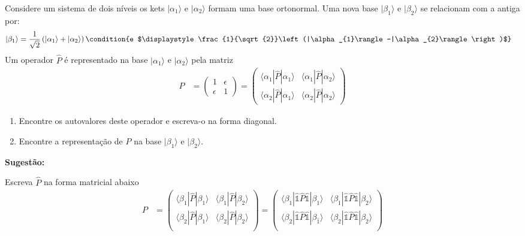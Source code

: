	\begin{prob}
		Considere um sistema de dois níveis os kets $|\alpha_{1}\rangle$ e $|\alpha_{2}\rangle$ formam uma base ortonormal. Uma nova base $|\beta_{1}\rangle$ e $|\beta_{2}\rangle$ se relacionam com a antiga por:
		\begin{align}
			|\beta_{1}\rangle &= \frac{1}{\sqrt{2}}\left(|\alpha_{1}\rangle+|\alpha_{2}\rangle\right)\condition{e $\displaystyle\frac{1}{\sqrt{2}}\left(|\alpha_{1}\rangle-|\alpha_{2}\rangle\right)$}
		\end{align}
		Um operador $\hat{P}$ é representado na base $|\alpha_{1}\rangle$ e $|\alpha_{2}\rangle$ pela matriz
		\begin{align}
			P &= 
			\begin{pmatrix}
				1 & \epsilon \\
				\epsilon & 1
			\end{pmatrix}
			=
			\begin{pmatrix}
			\langle \alpha_{1}|\hat{P}|\alpha_{1}\rangle & \langle \alpha_{1}|\hat{P}|\alpha_{2}\rangle \\
			\langle \alpha_{2}|\hat{P}|\alpha_{1}\rangle & \langle \alpha_{2}|\hat{P}|\alpha_{2}\rangle
			\end{pmatrix}
		\end{align}
		\begin{enumerate}[label=\alph *)]
			\item Encontre os autovalores deste operador e escreva-o na forma diagonal.
			\item Encontre a representação de $\hat{P}$ na base $|\beta_{1}\rangle$ e $|\beta_{2}\rangle$.
		\end{enumerate}

		\textbf{Sugestão:}

		Escreva $\hat{P}$ na forma matricial abaixo
		\begin{align}
			P &=
			\begin{pmatrix}
				\langle \beta_{1}|\hat{P}|\beta_{1}\rangle & \langle \beta_{1}|\hat{P}|\beta_{2}\rangle \\
				\langle \beta_{2}|\hat{P}|\beta_{1}\rangle & \langle \beta_{2}|\hat{P}|\beta_{2}\rangle \\
			\end{pmatrix}
			=
			\begin{pmatrix}
				\langle \beta_{1}|\mathbb{\hat{1}}\hat{P}\mathbb{\hat{1}}|\beta_{1}\rangle & \langle \beta_{1}|\mathbb{\hat{1}}\hat{P}\mathbb{\hat{1}}|\beta_{2}\rangle \\
				\langle \beta_{2}|\mathbb{\hat{1}}\hat{P}\mathbb{\hat{1}}|\beta_{\hat{1}}\rangle & \langle \beta_{2}|\mathbb{\hat{1}}\hat{P}\mathbb{\hat{1}}|\beta_{2}\rangle \\
			\end{pmatrix}
		\end{align}


\end{prob}
